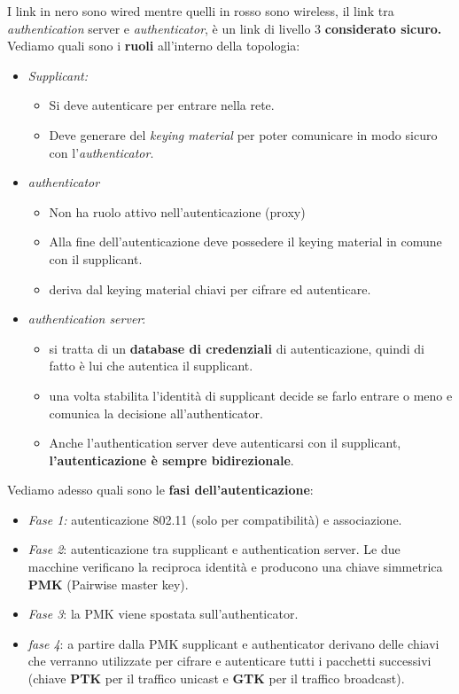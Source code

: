 \documentclass[12pt]{article}
\begin{document}
				I link in nero sono wired mentre quelli in rosso sono wireless, il link tra \textit{authentication} server e \textit{authenticator}, è un link di livello 3 \textbf{considerato sicuro.}\\
				Vediamo quali sono i \textbf{ruoli} all'interno della topologia:
				\begin{itemize}
					\item \textit{Supplicant:} 
					\begin{itemize}
						\item Si deve autenticare per entrare nella rete.
						\item Deve generare del \textit{keying material} per poter comunicare in modo sicuro con l'\textit{authenticator}.
					\end{itemize}
					\item \textit{authenticator}
					\begin{itemize}
						\item Non ha ruolo attivo nell'autenticazione (proxy)
						\item Alla fine dell'autenticazione deve possedere il keying material in comune con il supplicant.
						\item deriva dal keying material chiavi per cifrare ed autenticare.
					\end{itemize}
					\item \textit{authentication server}:
					\begin{itemize}
						\item si tratta di un \textbf{database di credenziali} di autenticazione, quindi di fatto è lui che autentica il supplicant.
						\item una volta stabilita l'identità di supplicant decide se farlo entrare o meno e comunica la decisione all'authenticator.
						\item Anche l'authentication server deve autenticarsi con il supplicant, \textbf{l'autenticazione è sempre bidirezionale}.
					\end{itemize}
				\end{itemize}
				Vediamo adesso quali sono le \textbf{fasi dell'autenticazione}:
				\begin{itemize}
					\item \textit{Fase 1:} autenticazione 802.11 (solo per compatibilità) e associazione.
					\item \textit{Fase 2}: autenticazione tra supplicant e
					authentication server. Le due macchine verificano la reciproca
					identità e producono una chiave simmetrica \textbf{PMK} (Pairwise master key).
					\item \textit{Fase 3}: la PMK viene spostata sull'authenticator.
					\item \textit{fase 4}: a partire dalla PMK supplicant e authenticator
					derivano delle chiavi che verranno utilizzate per cifrare e
					autenticare tutti i pacchetti successivi (chiave \textbf{PTK} per il traffico
					unicast e \textbf{GTK} per il traffico broadcast).
				\end{itemize}
\end{document}
